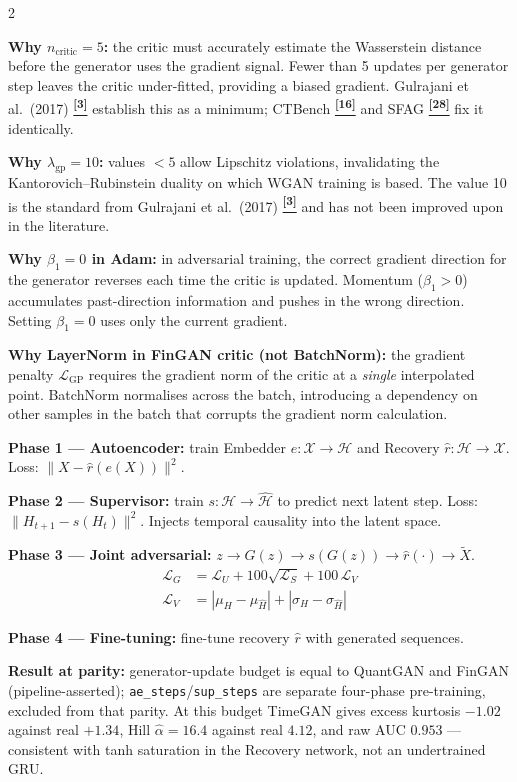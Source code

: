 \documentclass[10pt]{article}
\newcommand{\navybox}[2]{\begin{tcolorbox}[mybox={Navy}{LBg},title={#1}]#2\end{tcolorbox}}
\newcommand{\tealbox}[2]{\begin{tcolorbox}[mybox={Teal}{LBg},title={#1}]#2\end{tcolorbox}}
\newcommand{\tcite}[1]{%
  \hyperlink{R:#1}{\textsuperscript{\scriptsize\textbf{[#1]}}}}
\begin{document}
\vspace{6pt}
\begin{multicols}{2}
\small

\navybox{WGAN-GP shared settings (QuantGAN \& FinGAN)}{%
\textbf{Why $n_\text{critic}=5$:} the critic must accurately estimate the Wasserstein distance before the generator uses the gradient signal. Fewer than 5 updates per generator step leaves the critic under-fitted, providing a biased gradient. Gulrajani et al.\ (2017)\tcite{3} establish this as a minimum; CTBench\tcite{16} and SFAG\tcite{28} fix it identically.

\textbf{Why $\lambda_\text{gp}=10$:} values $<5$ allow Lipschitz violations, invalidating the Kantorovich--Rubinstein duality on which WGAN training is based. The value 10 is the standard from Gulrajani et al.\ (2017)\tcite{3} and has not been improved upon in the literature.

\textbf{Why $\beta_1=0$ in Adam:} in adversarial training, the correct gradient direction for the generator reverses each time the critic is updated. Momentum ($\beta_1>0$) accumulates past-direction information and pushes in the wrong direction. Setting $\beta_1=0$ uses only the current gradient.

\textbf{Why LayerNorm in FinGAN critic (not BatchNorm):} the gradient penalty $\mathcal{L}_\text{GP}$ requires the gradient norm of the critic at a \emph{single} interpolated point. BatchNorm normalises across the batch, introducing a dependency on other samples in the batch that corrupts the gradient norm calculation.}

\columnbreak

\tealbox{TimeGAN four-phase training}{%
\textbf{Phase 1 --- Autoencoder:} train Embedder $e: \mathcal{X} \to \mathcal{H}$ and Recovery $\hat{r}: \mathcal{H} \to \mathcal{X}$. Loss: $\|X - \hat{r}(e(X))\|^2$.

\textbf{Phase 2 --- Supervisor:} train $s: \mathcal{H} \to \hat{\mathcal{H}}$ to predict next latent step. Loss: $\|H_{t+1} - s(H_t)\|^2$. Injects temporal causality into the latent space.

\textbf{Phase 3 --- Joint adversarial:} $z \to G(z) \to s(G(z)) \to \hat{r}(\cdot) \to \tilde{X}$.
\begin{align*}
  \mathcal{L}_G &= \mathcal{L}_U + 100\sqrt{\mathcal{L}_S} + 100\,\mathcal{L}_V \\
  \mathcal{L}_V &= |\mu_H - \mu_{\hat{H}}| + |\sigma_H - \sigma_{\hat{H}}|
\end{align*}

\textbf{Phase 4 --- Fine-tuning:} fine-tune recovery $\hat{r}$ with generated sequences.

\textbf{Result at parity:} generator-update budget is equal to QuantGAN and FinGAN (pipeline-asserted); \texttt{ae\_steps}/\texttt{sup\_steps} are separate four-phase pre-training, excluded from that parity. At this budget TimeGAN gives excess kurtosis $-1.02$ against real $+1.34$, Hill $\hat\alpha=16.4$ against real $4.12$, and raw AUC $0.953$ --- consistent with tanh saturation in the Recovery network, not an undertrained GRU.}

\end{multicols}
\end{document}
